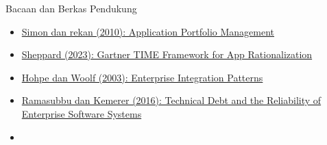 \documentclass[aspectratio=169, table, 12pt]{beamer}
\begin{document}
\begin{frame}{{\Large Bacaan dan Berkas Pendukung}}
  \small
  \begin{itemize}
    \item \href{https://aisel.aisnet.org/cais/vol26/iss1/3/}{Simon dan rekan (2010): Application Portfolio Management}
    \item \href{https://www.leanix.net/en/blog/gartner-time-tolerate}{Sheppard (2023): Gartner TIME Framework for App Rationalization}
    \item \href{https://www.enterpriseintegrationpatterns.com/patterns/messaging/IntegrationStylesIntro.html}{Hohpe dan Woolf (2003): Enterprise Integration Patterns}
    \item \href{https://doi.org/10.1287/mnsc.2015.2196}{Ramasubbu dan Kemerer (2016): Technical Debt and the Reliability of Enterprise Software Systems}
    \item {}
  \end{itemize}
\end{frame}
\end{document}
